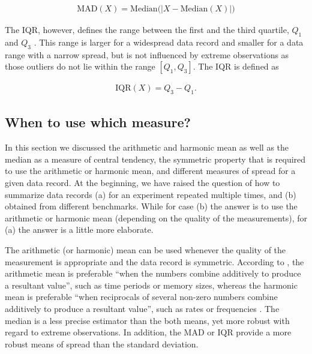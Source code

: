 \begin{equation} \label{eq:mad}
\begin{split}
\mathrm{MAD}(X) = \mathrm{Median}\big(|X - \mathrm{Median}(X)|\big)
\end{split}
\end{equation}
 
The IQR, however, defines the range between the first and the third quartile,
$Q_1$ and $Q_3$ \citep{shanmugam_statistics_2015}. This range is larger for a
widespread data record and smaller for a data range with a narrow spread, but is not influenced by extreme
observations as those outliers do not lie within the range $\left[ Q_1,Q_3
\right] $. The IQR is defined as 

\begin{equation} \label{eq:iqr}
\begin{split}
\mathrm{IQR}(X) = Q_3 - Q_1.
\end{split}
\end{equation}

\subsection{When to use which measure?}
In this section we discussed the arithmetic and harmonic mean as well as the
median as a measure of central tendency, the symmetric property that is
required to use the arithmetic or harmonic mean, and different measures of
spread for a given data record. At the beginning, we have raised the question of how to
summarize data records (a) for an experiment repeated multiple times, and (b)
obtained from different benchmarks. While for case (b) the answer is to use the
arithmetic or harmonic mean (depending on the quality of the measurements), for
(a) the answer is a little more elaborate.

The arithmetic (or harmonic) mean can be used whenever the quality of the
measurement is appropriate and the data record is symmetric. According to
\cite{shanmugam_statistics_2015}, the arithmetic mean is preferable ``when the numbers combine
additively to produce a resultant value'', such as time periods or memory sizes, whereas
the harmonic mean is preferable ``when reciprocals of several non-zero numbers
combine additively to produce a resultant value'', such as rates or frequencies
\citep{smith_characterizing_1988}.
The median is a less precise estimator than the both means, yet more robust
with regard to extreme observations. In addition, the MAD or IQR provide a more
robust means of spread than the standard deviation.

